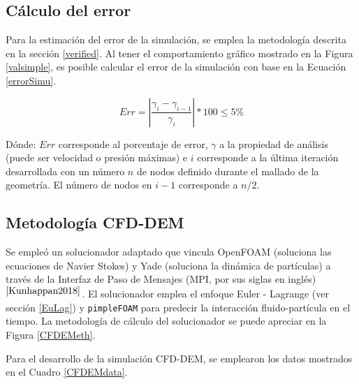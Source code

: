 



\subsection{C\'alculo del error} \label{SimuErr}

\noindent
\justify

Para la estimaci\'on del error de la simulaci\'on, se emplea la metodolog\'ia descrita en la secci\'on \ref{verified}. Al tener el comportamiento gr\'afico mostrado en la Figura \ref{valsimple}, es posible calcular el error de la simulaci\'on con base en la Ecuaci\'on \ref{errorSimu}.

\begin{equation}
	Err = \left| \frac{\gamma _i - \gamma _{i-1}}{\gamma _i} \right| *100 \leq 5 \%
	\label{errorSimu}
\end{equation}

\noindent
\justify

D\'onde: $Err$ corresponde al porcentaje de error, $\gamma$ a la propiedad de an\'alisis (puede ser velocidad o presi\'on m\'aximas) e $i$ corresponde a la \'ultima iteraci\'on desarrollada con un n\'umero $n$ de nodos definido durante el mallado de la geometr\'ia. El n\'umero de nodos en $i-1$ corresponde a $n/2$.

\subsection{Metodolog\'ia CFD-DEM}

\noindent
\justify

Se emple\'o un solucionador adaptado que vincula OpenFOAM (soluciona las ecuaciones de Navier Stokes) y Yade (soluciona la din\'amica de part\'iculas) a trav\'es de la Interfaz de Paso de Mensajes (MPI, por sus siglas en ingl\'es)$^{\cite{Kunhappan2018}}$. El solucionador emplea el enfoque Euler - Lagrange (ver secci\'on \ref{EuLag}) y \texttt{pimpleFOAM} para predecir la interacci\'on fluido-part\'icula en el tiempo. La metodolog\'ia de c\'alculo del solucionador se puede apreciar en la Figura \ref{CFDEMeth}.



\noindent
\justify

Para el desarrollo de la simulaci\'on CFD-DEM, se emplearon los datos mostrados en el Cuadro \ref{CFDEMdata}.

